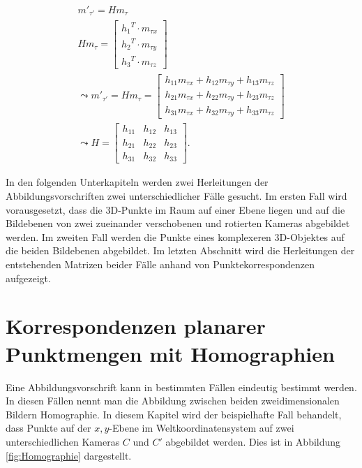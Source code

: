 \begin{gather}
	m'_{\tau'} = Hm_{\tau}\\
	Hm_{\tau} = \begin{bmatrix}
		{h_1}^T \cdot m_{\tau x}\\{h_2}^T \cdot m_{\tau y}\\{h_3}^T \cdot m_{\tau z}
	\end{bmatrix} \\
	\leadsto 
	m'_{\tau'}= Hm_{\tau}= \begin{bmatrix}
		h_{11}m_{\tau x}+h_{12}m_{\tau y}+h_{13}m_{\tau z}\\
		h_{21}m_{\tau x}+h_{22}m_{\tau y}+h_{23}m_{\tau z}\\
		h_{31}m_{\tau x}+h_{32}m_{\tau y}+h_{33}m_{\tau z}
	\end{bmatrix}\\
	\leadsto 
	H=\begin{bmatrix}
		h_{11}&h_{12}&h_{13}\\
		h_{21}&h_{22}&h_{23}\\
		h_{31}&h_{32}&h_{33}
	\end{bmatrix}.
\end{gather}


In den folgenden Unterkapiteln werden zwei Herleitungen der Abbildungsvorschriften zwei unterschiedlicher Fälle gesucht. Im ersten Fall wird vorausgesetzt, dass die 3D-Punkte im Raum auf einer Ebene liegen und auf die Bildebenen von zwei zueinander verschobenen und rotierten Kameras abgebildet werden. Im zweiten Fall werden die Punkte eines komplexeren 3D-Objektes auf die beiden Bildebenen abgebildet. Im letzten Abschnitt wird die Herleitungen der entstehenden Matrizen beider Fälle anhand von Punktekorrespondenzen aufgezeigt. 


\section{Korrespondenzen planarer Punktmengen mit Homographien}

Eine Abbildungsvorschrift kann in bestimmten Fällen eindeutig bestimmt werden. In diesen Fällen nennt man die Abbildung zwischen beiden zweidimensionalen Bildern Homographie\cite{HZ,Elements}. In diesem Kapitel wird der beispielhafte Fall behandelt, dass Punkte auf der $x,y$-Ebene im Weltkoordinatensystem auf zwei unterschiedlichen Kameras $C$ und $C'$ abgebildet werden. Dies ist in Abbildung \ref{fig:Homographie} dargestellt.
\pagebreak


